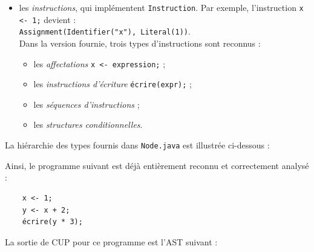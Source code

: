 \documentclass{td}
\begin{document}
\begin{exercice}
\begin{itemize}
  \item les \emph{instructions}, qui implémentent \lstinline|Instruction|.
    Par exemple, l'instruction \lstinline|x <- 1;| devient :\\
    \hspace*{1cm}\lstinline|Assignment(Identifier("x"), Literal(1))|.\\[1mm]
    Dans la version fournie, trois types d'instructions sont reconnus :
    \begin{itemize}
    \item les \emph{affectations} \lstinline|x <- expression;| ;
    \item les \emph{instructions d'écriture} \lstinline|écrire(expr);| ;
    \item les \emph{séquences d'instructions} ;
    \item les \emph{structures conditionnelles}. 
    \end{itemize}

  \end{itemize}

  La hiérarchie des types fournis dans \lstinline|Node.java| est illustrée ci-dessous :

  \begin{center}
  \end{center}

  Ainsi, le programme suivant est déjà entièrement reconnu et correctement analysé :

  \begin{lstlisting}
    x <- 1;
    y <- x + 2;
    écrire(y * 3);
  \end{lstlisting}

  La sortie de CUP pour ce programme est l'AST suivant :


\end{exercice}
\end{document}
